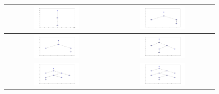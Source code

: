 \begin{figure}[ht]
 \centering
 \begin{tabular}{| c | c |}
   \hline
   \includegraphics[width=0.45\textwidth]{graphs/2_0}
   &\includegraphics[width=0.45\textwidth]{graphs/2_1}\\\hline
   \includegraphics[width=0.45\textwidth]{graphs/2_2}
   &\includegraphics[width=0.45\textwidth]{graphs/2_3}\\\hline
   \includegraphics[width=0.45\textwidth]{graphs/2_4}
   &\includegraphics[width=0.45\textwidth]{graphs/2_5}\\\hline

\end{tabular}
\end{figure}
